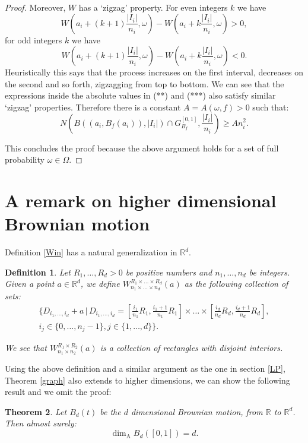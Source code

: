 \documentclass{amsart}
\newcommand{\Assouad}{\dim_{\mathrm{A}}}
\newtheorem{thm}{Theorem}[section]
\newtheorem{defn}[thm]{Definition}
\begin{document}
\begin{proof}
      Moreover, $W$ has a `zigzag' property. For even integers $k$ we have
\[
W\left(a_i+(k+1)\frac{|I_i|}{n_i},\omega\right)-W\left(a_i+k\frac{|I_i|}{n_i},\omega\right)>0,
\] 
for odd integers $k$ we have
\[
W\left(a_i+(k+1)\frac{|I_i|}{n_i},\omega\right)-W\left(a_i+k\frac{|I_i|}{n_i},\omega\right)<0.
\]  
Heuristically this says that the process increases on the first interval, decreases on the second and so forth, zigzagging from top to bottom. We can see that the expressions inside the absolute values in (**) and (***) also satisfy similar `zigzag' properties. Therefore there is a constant $A=A(\omega,f)>0$ such that:
\[
N\left(B\left(\left(a_i,B_f(a_i)\right),|I_i|\right)\cap G_{B_f}^{[0,1]},\frac{|I_i|}{n_i}\right)\geq A n_i^2.
\] 

This concludes the proof because the above argument holds for a set of full probability $\omega\in\Omega$.
\end{proof}



\section{A remark on higher dimensional Brownian motion}

Definition \ref{Win} has a natural generalization in $\mathbb{R}^d$.
		\begin{defn}\label{Win2}
		Let $R_1,\dots,R_d>0$ be positive numbers and $n_1,\dots, n_d$ be integers. Given a point $a\in\mathbb{R}^d$, we define $W_{n_1\times\dots\times n_d}^{R_1\times\dots\times R_d}(a)$ as the following collection of sets:
		\begin{eqnarray*}
		\Bigg\{D_{i_1,\dots,i_d}+a \, \vert \, D_{i_1,\dots,i_d}=\left[\frac{i_1}{n_1}R_1,\frac{i_1+1}{n_1}R_1\right]\times\dots\times \left[\frac{i_d}{n_d}R_d,\frac{i_d+1}{n_d}R_d\right],\\ i_j\in\{0,\dots,n_j-1\}, j\in\{1,\dots,d\}\Bigg\}.
		\end{eqnarray*}
		
		We see that $W_{n_1\times n_2}^{R_1\times R_2}(a)$ is a collection of rectangles with disjoint interiors.
	\end{defn}

Using the above definition and a similar argument as the one in section \ref{LP},  Theorem \ref{graph} also extends to higher dimensions, we can show the following result and we omit the proof:

\begin{thm}
	Let $B_d(t)$ be the $d$ dimensional Brownian motion, from $\mathbb{R}$ to $\mathbb{R}^d$. Then almost surely:
	\[
	\Assouad B_d([0,1])=d.
	\]
\end{thm}
\end{document}
